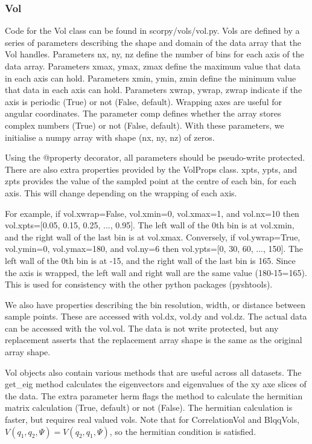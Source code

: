 \documentclass[a4, 12pt]{article}
\begin{document}
\subsubsection{Vol}
Code for the Vol class can be found in scorpy/vols/vol.py.
Vols are defined by a series of parameters describing the shape and domain of the data array that the Vol handles. Parameters nx, ny, nz define the number of bins for each axis of the data array. Parameters xmax, ymax, zmax define the maximum value that data in each axis can hold. Parameters xmin, ymin, zmin define the minimum value that data in each axis can hold. Parameters xwrap, ywrap, zwrap indicate if the axis is periodic (True) or not (False, default). Wrapping axes are useful for angular coordinates. The parameter comp defines whether the array stores complex numbers (True) or not (False, default). With these parameters, we initialise a numpy array with shape (nx, ny, nz) of zeros.

Using the @property decorator, all parameters should be pseudo-write protected. There are also extra properties provided by the VolProps class. xpts, ypts, and zpts provides the value of the sampled point at the centre of each bin, for each axis. This will change depending on the wrapping of each axis. 

For example, if vol.xwrap=False, vol.xmin=0, vol.xmax=1, and vol.nx=10 then vol.xpts=[0.05, 0.15, 0.25, ..., 0.95]. The left wall of the 0th bin is at vol.xmin, and the right wall of the last bin is at vol.xmax. Conversely, if vol.ywrap=True, vol.ymin=0, vol.ymax=180, and vol.ny=6 then vol.ypts=[0, 30, 60, ..., 150]. The left wall of the 0th bin is at -15, and the right wall of the last bin is 165. Since the axis is wrapped, the left wall and right wall are the same value (180-15=165). This is used for consistency with the other python packages (pyshtools).

We also have properties describing the bin resolution, width, or distance between sample points. These are accessed with vol.dx, vol.dy and vol.dz. The actual data can be accessed with the vol.vol. The data is not write protected, but any replacement asserts that the replacement array shape is the same as the original array shape.

Vol objects also contain various methods that are useful across all datasets. The get\_eig method calculates the eigenvectors and eigenvalues of the xy axe slices of the data. The extra parameter herm flags the method to calculate the hermitian matrix calculation (True, default) or not (False). The hermitian calculation is faster, but requires real valued vols. Note that for CorrelationVol and BlqqVols, $V(q_1, q_2, \Psi) = V(q_2, q_1, \Psi)$, so the hermitian condition is satisfied.
\end{document}

